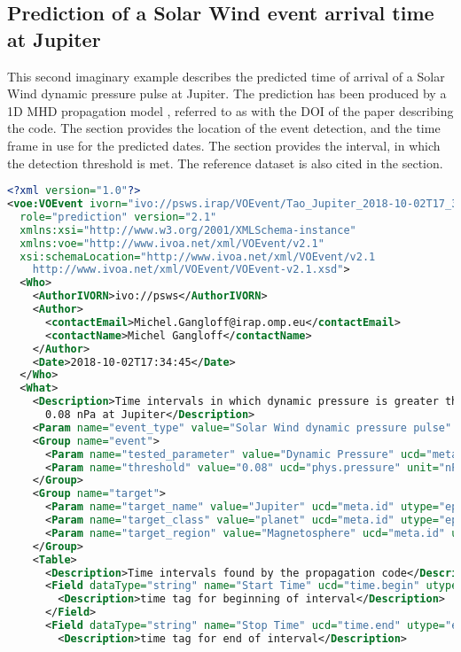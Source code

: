 \documentclass[11pt,a4paper]{ivoa}
\begin{document}
\subsection{Prediction of a Solar Wind event arrival time at Jupiter}
This second imaginary example describes the predicted time of arrival of
a Solar Wind dynamic pressure pulse at Jupiter. The prediction has been
produced by a 1D MHD propagation model \cite{tao05}, referred to as with
the DOI of the paper describing the code. The  section provides
the location of the event detection, and the time frame in use for the
predicted dates. The  section provides the interval, in which the
detection threshold is met. The reference dataset is also cited in the
 section.
\begin{lstlisting}[language=XML]
<?xml version="1.0"?>
<voe:VOEvent ivorn="ivo://psws.irap/VOEvent/Tao_Jupiter_2018-10-02T17_34_45::v1.0"
  role="prediction" version="2.1"
  xmlns:xsi="http://www.w3.org/2001/XMLSchema-instance"
  xmlns:voe="http://www.ivoa.net/xml/VOEvent/v2.1"
  xsi:schemaLocation="http://www.ivoa.net/xml/VOEvent/v2.1
    http://www.ivoa.net/xml/VOEvent/VOEvent-v2.1.xsd">
  <Who>
    <AuthorIVORN>ivo://psws</AuthorIVORN>
    <Author>
      <contactEmail>Michel.Gangloff@irap.omp.eu</contactEmail>
      <contactName>Michel Gangloff</contactName>
    </Author>
    <Date>2018-10-02T17:34:45</Date>
  </Who>
  <What>
    <Description>Time intervals in which dynamic pressure is greater than
      0.08 nPa at Jupiter</Description>
    <Param name="event_type" value="Solar Wind dynamic pressure pulse" ucd="meta.id"/>
    <Group name="event">
      <Param name="tested_parameter" value="Dynamic Pressure" ucd="meta.id" dataType="string"/>
      <Param name="threshold" value="0.08" ucd="phys.pressure" unit="nPa" dataType="string"/>
    </Group>
    <Group name="target">
      <Param name="target_name" value="Jupiter" ucd="meta.id" utype="epn:target_name"/>
      <Param name="target_class" value="planet" ucd="meta.id" utype="epn:target_class"/>
      <Param name="target_region" value="Magnetosphere" ucd="meta.id" utype="epn:target_region"/>
    </Group>
    <Table>
      <Description>Time intervals found by the propagation code</Description>
      <Field dataType="string" name="Start Time" ucd="time.begin" utype="epn:time_min">
        <Description>time tag for beginning of interval</Description>
      </Field>
      <Field dataType="string" name="Stop Time" ucd="time.end" utype="epn:time_max">
        <Description>time tag for end of interval</Description>

\end{lstlisting}
\end{document}
